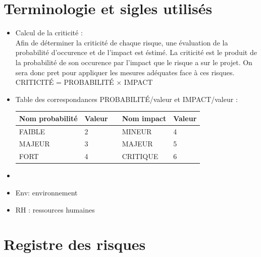 \documentclass[a4paper,11pt,french]{article}
\begin{document}
\section{Terminologie et sigles utilisés}
\begin{itemize}
\item Calcul de la criticité :\\

Afin de déterminer la criticité de chaque risque, une évaluation de la probabilité d'occurence et de l'impact est éstimé. La criticité est le produit de la probabilité de son occurence par l'impact que le risque a sur le projet. On sera donc pret pour appliquer les mesures adéquates face à ces risques. \\

{\centering CRITICITÉ = PROBABILITÉ $\times$ IMPACT} \\

\item Table des correspondances PROBABILITÉ/valeur et IMPACT/valeur :\\

\begin{center}
\begin{tabular}{|l|l|c|l|l|}
\hline
\textbf{Nom probabilité}&\textbf{Valeur}&&\textbf{Nom impact}&\textbf{Valeur}\\
\hline
FAIBLE&2&&MINEUR&4\\
\hline
MAJEUR&3&&MAJEUR&5\\
\hline
FORT&4&&CRITIQUE&6\\
\hline
\end{tabular}
\end{center}
\item []
\item Env: environnement
\item RH : ressources humaines
\end{itemize}
\section{Registre des risques}
\end{document}
